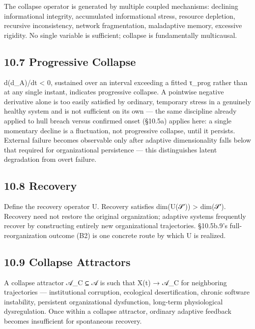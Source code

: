 \documentclass[
]{article}
\begin{document}
The collapse operator is generated by multiple coupled mechanisms:
declining informational integrity, accumulated informational stress,
resource depletion, recursive inconsistency, network fragmentation,
maladaptive memory, excessive rigidity. No single variable is
sufficient; collapse is fundamentally multicausal.

\hypertarget{progressive-collapse}{%
\subsection{10.7 Progressive Collapse}\label{progressive-collapse}}

d(d\_A)/dt \textless{} 0, sustained over an interval exceeding a fitted
τ\_prog rather than at any single instant, indicates progressive
collapse. A pointwise negative derivative alone is too easily satisfied
by ordinary, temporary stress in a genuinely healthy system and is not
sufficient on its own --- the same discipline already applied to hull
breach versus confirmed onset (§10.5a) applies here: a single momentary
decline is a fluctuation, not progressive collapse, until it persists.
External failure becomes observable only after adaptive dimensionality
falls below that required for organizational persistence --- this
distinguishes latent degradation from overt failure.

\hypertarget{recovery}{%
\subsection{10.8 Recovery}\label{recovery}}

Define the recovery operator U. Recovery satisfies dim(U(𝒮′))
\textgreater{} dim(𝒮′). Recovery need not restore the original
organization; adaptive systems frequently recover by constructing
entirely new organizational trajectories. §10.5b.9's full-reorganization
outcome (B2) is one concrete route by which U is realized.

\hypertarget{collapse-attractors}{%
\subsection{10.9 Collapse Attractors}\label{collapse-attractors}}

A collapse attractor 𝒜\_C ⊆ 𝒜 is such that X(t) → 𝒜\_C for neighboring
trajectories --- institutional corruption, ecological desertification,
chronic software instability, persistent organizational dysfunction,
long-term physiological dysregulation. Once within a collapse attractor,
ordinary adaptive feedback becomes insufficient for spontaneous
recovery.
\end{document}
